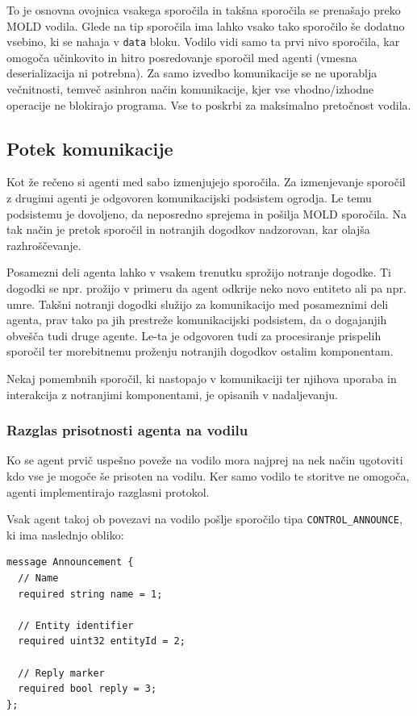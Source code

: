 \documentclass[a4paper,10pt]{article}
\begin{document}
\noindent
To je osnovna ovojnica vsakega sporočila in takšna sporočila se prenašajo preko MOLD vodila. Glede na tip sporočila ima lahko vsako tako sporočilo še dodatno vsebino, ki se nahaja v \texttt{data} bloku. Vodilo vidi samo ta prvi nivo sporočila, kar omogoča učinkovito in hitro posredovanje sporočil med agenti (vmesna deserializacija ni potrebna). Za samo izvedbo komunikacije se ne uporablja večnitnosti, temveč asinhron način komunikacije, kjer vse vhodno/izhodne operacije ne blokirajo programa. Vse to poskrbi za maksimalno pretočnost vodila.

\subsection{Potek komunikacije}

Kot že rečeno si agenti med sabo izmenjujejo sporočila. Za izmenjevanje sporočil z drugimi agenti je odgovoren komunikacijski podsistem ogrodja. Le temu podsistemu je dovoljeno, da neposredno sprejema in pošilja MOLD sporočila. Na tak način je pretok sporočil in notranjih dogodkov nadzorovan, kar olajša razhroščevanje.

Posamezni deli agenta lahko v vsakem trenutku sprožijo notranje dogodke. Ti dogodki se npr. prožijo v primeru da agent odkrije neko novo entiteto ali pa npr. umre. Takšni notranji dogodki služijo za komunikacijo med posameznimi deli agenta, prav tako pa jih prestreže komunikacijski podsistem, da o dogajanjih obvešča tudi druge agente. Le-ta je odgovoren tudi za procesiranje prispelih sporočil ter morebitnemu proženju notranjih dogodkov ostalim komponentam.

Nekaj pomembnih sporočil, ki nastopajo v komunikaciji ter njihova uporaba in interakcija z notranjimi komponentami, je opisanih v nadaljevanju.

\subsubsection{Razglas prisotnosti agenta na vodilu}

Ko se agent prvič uspešno poveže na vodilo mora najprej na nek način ugotoviti kdo vse je mogoče še prisoten na vodilu. Ker samo vodilo te storitve ne omogoča, agenti implementirajo razglasni protokol.

Vsak agent takoj ob povezavi na vodilo pošlje sporočilo tipa \texttt{CONTROL\_ANNOUNCE}, ki ima naslednjo obliko:
\begin{verbatim}
message Announcement {
  // Name
  required string name = 1;
  
  // Entity identifier
  required uint32 entityId = 2;
  
  // Reply marker
  required bool reply = 3;
};
\end{verbatim}
\end{document}
